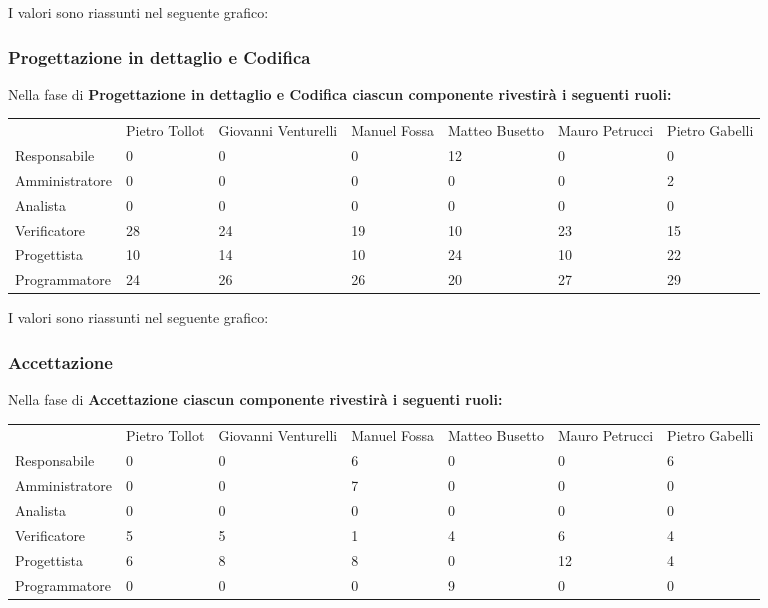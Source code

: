 I valori sono riassunti nel seguente grafico:


\subsubsection{Progettazione in dettaglio e Codifica}
Nella fase di \bf{Progettazione in dettaglio e Codifica} ciascun componente rivestir\`{a} i seguenti ruoli:

\begin{table}[h] %
\begin{tabular}{lllllll}
 & Pietro Tollot & Giovanni Venturelli & Manuel Fossa & Matteo Busetto & Mauro Petrucci & Pietro Gabelli \\
Responsabile & 0 & 0 & 0 & 12 & 0 & 0 \\
Amministratore & 0 & 0 & 0 & 0 & 0 & 2 \\
Analista & 0 & 0 & 0 & 0 & 0 & 0 \\
Verificatore & 28 & 24 & 19 & 10 & 23 & 15 \\
Progettista & 10 & 14 & 10 & 24 & 10 & 22 \\
Programmatore & 24 & 26 & 26 & 20 & 27 & 29 
\end{tabular}
\end{table}

I valori sono riassunti nel seguente grafico:


\subsubsection{Accettazione}
Nella fase di \bf{Accettazione} ciascun componente rivestir\`{a} i seguenti ruoli:

\begin{table}[h] %
\begin{tabular}{lllllll}
 & Pietro Tollot & Giovanni Venturelli & Manuel Fossa & Matteo Busetto & Mauro Petrucci & Pietro Gabelli \\
Responsabile & 0 & 0 & 6 & 0 & 0 & 6 \\
Amministratore & 0 & 0 & 7 & 0 & 0 & 0 \\
Analista & 0 & 0 & 0 & 0 & 0 & 0 \\
Verificatore & 5 & 5 & 1 & 4 & 6 & 4 \\
Progettista & 6 & 8 & 8 & 0 & 12 & 4 \\
Programmatore & 0 & 0 & 0 & 9 & 0 & 0 
\end{tabular}
\end{table}

